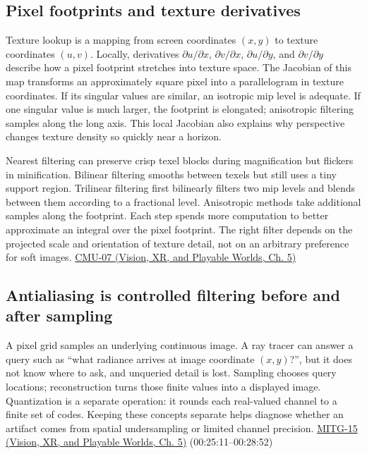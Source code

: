 \subsection{Pixel footprints and texture derivatives}\label{03-visual-computing-i-ch004-pixel-footprints-and-texture-derivatives}

\hypertarget{03-visual-computing-i-ch004-pixel-footprints-and-texture-derivatives}{}

Texture lookup is a mapping from screen coordinates \((x,y)\) to texture coordinates \((u,v)\). Locally, derivatives \(\partial u/\partial x\), \(\partial v/\partial x\), \(\partial u/\partial y\), and \(\partial v/\partial y\) describe how a pixel footprint stretches into texture space. The Jacobian of this map transforms an approximately square pixel into a parallelogram in texture coordinates. If its singular values are similar, an isotropic mip level is adequate. If one singular value is much larger, the footprint is elongated; anisotropic filtering samples along the long axis. This local Jacobian also explains why perspective changes texture density so quickly near a horizon.

Nearest filtering can preserve crisp texel blocks during magnification but flickers in minification. Bilinear filtering smooths between texels but still uses a tiny support region. Trilinear filtering first bilinearly filters two mip levels and blends between them according to a fractional level. Anisotropic methods take additional samples along the footprint. Each step spends more computation to better approximate an integral over the pixel footprint. The right filter depends on the projected scale and orientation of texture detail, not on an arbitrary preference for soft images. \href{../07-Vision-XR-and-Playable-Worlds/main.pdf\#nameddest=04-visual-computing-ii-ch036-cmu-07---perspective-projection-and-texture-mapping}{CMU-07 (Vision, XR, and Playable Worlds, Ch. 5)}

\subsection{Antialiasing is controlled filtering before and after sampling}\label{03-visual-computing-i-ch004-antialiasing-is-controlled-filtering-before-and-after-sampling}

\hypertarget{03-visual-computing-i-ch004-antialiasing-is-controlled-filtering-before-and-after-sampling}{}

A pixel grid samples an underlying continuous image. A ray tracer can answer a query such as ``what radiance arrives at image coordinate \((x,y)\)?'', but it does not know where to ask, and unqueried detail is lost. Sampling chooses query locations; reconstruction turns those finite values into a displayed image. Quantization is a separate operation: it rounds each real-valued channel to a finite set of codes. Keeping these concepts separate helps diagnose whether an artifact comes from spatial undersampling or limited channel precision. \href{../07-Vision-XR-and-Playable-Worlds/main.pdf\#nameddest=04-visual-computing-ii-ch036-mitg-15---antialiasing}{MITG-15 (Vision, XR, and Playable Worlds, Ch. 5)} (00:25:11--00:28:52)

